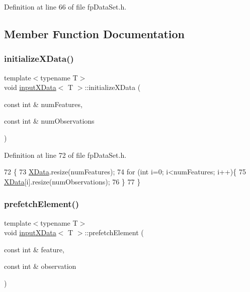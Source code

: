 Definition at line 66 of file fp\+Data\+Set.\+h.



\subsection{Member Function Documentation}
\mbox{\label{classinputXData_a540e403a6520cb1747d0d08c7df18bf4}} 
\subsubsection{\texorpdfstring{initialize\+X\+Data()}{initializeXData()}}
{\footnotesize\ttfamily template$<$typename T$>$ \\
void \hyperlink{classinputXData}{input\+X\+Data}$<$ T $>$\+::initialize\+X\+Data (\begin{DoxyParamCaption}\item[{const int \&}]{num\+Features,  }\item[{const int \&}]{num\+Observations }\end{DoxyParamCaption})\hspace{0.3cm}{\ttfamily [inline]}}



Definition at line 72 of file fp\+Data\+Set.\+h.


\begin{DoxyCode}
72                                                                                  \{
73             \hyperlink{classinputXData_aff55a72217a7a3b66df91d01840e4206}{XData}.resize(numFeatures);
74             \textcolor{keywordflow}{for} (\textcolor{keywordtype}{int} i=0; i<numFeatures; i++)\{
75                 \hyperlink{classinputXData_aff55a72217a7a3b66df91d01840e4206}{XData}[i].resize(numObservations);
76             \}
77         \}
\end{DoxyCode}
\mbox{\label{classinputXData_a2e80664842e94288ea78bb2447b0f6f8}} 
\subsubsection{\texorpdfstring{prefetch\+Element()}{prefetchElement()}}
{\footnotesize\ttfamily template$<$typename T$>$ \\
void \hyperlink{classinputXData}{input\+X\+Data}$<$ T $>$\+::prefetch\+Element (\begin{DoxyParamCaption}\item[{const int \&}]{feature,  }\item[{const int \&}]{observation }\end{DoxyParamCaption})\hspace{0.3cm}{\ttfamily [inline]}}



